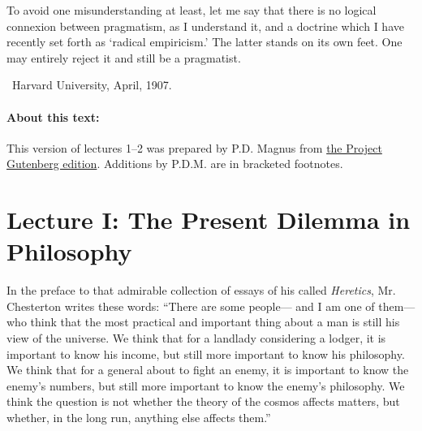 \documentclass[]{article}
\begin{document}


To avoid one misunderstanding at least, let me say that there is no logical connexion between pragmatism, as I understand it, and a doctrine
which I have recently set forth as `radical empiricism.' The latter
stands on its own feet. One may entirely reject it and still be a
pragmatist.

~\hfill Harvard University, April, 1907.

\paragraph{About this text:} This version of lectures 1--2 was prepared by P.D. Magnus from \href{http://www.gutenberg.org/ebooks/5116}{the Project Gutenberg edition}. Additions by P.D.M. are in bracketed footnotes.

\section*{Lecture I: The Present Dilemma in Philosophy}

In the preface to that admirable collection of essays of his called
\emph{Heretics}, Mr. Chesterton writes these words: ``There are some
people--- and I am one of them--- who think that the most practical and
important thing about a man is still his view of the universe. We think
that for a landlady considering a lodger, it is important to know his
income, but still more important to know his philosophy. We think that
for a general about to fight an enemy, it is important to know
the enemy's numbers, but still more important to know the enemy's
philosophy. We think the question is not whether the theory of the
cosmos affects matters, but whether, in the long run, anything else
affects them.''
\end{document}
